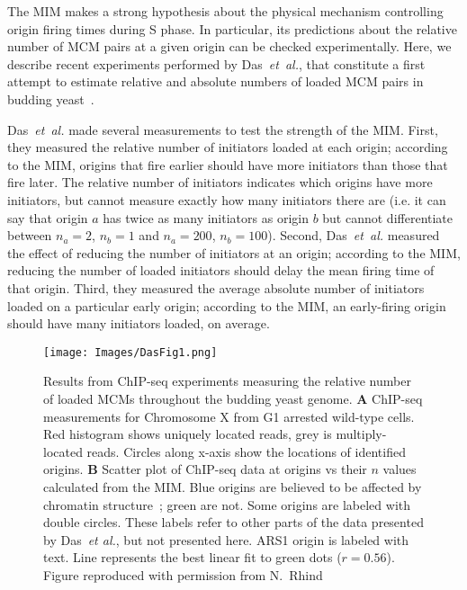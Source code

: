 {	The MIM makes a strong hypothesis about the physical mechanism controlling origin firing times during S phase.
	In particular, its predictions about the relative number of MCM pairs at a given origin can be checked experimentally.
	Here, we describe recent experiments performed by Das~\emph{et~al.}, that constitute a first attempt to estimate relative and absolute numbers of loaded MCM pairs in budding yeast~\cite{Rhind}.
	
	Das~\emph{et~al.} made several measurements to test the strength of the MIM.
	First, they measured the relative number of initiators loaded at each origin; according to the MIM, origins that fire earlier should have more initiators than those that fire later.
	The relative number of initiators indicates which origins have more initiators, but cannot measure exactly how many initiators there are (i.e. it can say that origin $a$ has twice as many initiators as origin $b$ but cannot differentiate between $n_a=2$, $n_b=1$ and $n_a=200$, $n_b=100$).
	Second, Das~\emph{et~al.} measured the effect of reducing the number of initiators at an origin; according to the MIM, reducing the number of loaded initiators should delay the mean firing time of that origin.
	Third, they measured the average absolute number of initiators loaded on a particular early origin; according to the MIM, an early-firing origin should have many initiators loaded, on average.
		
		\begin{figure}[tbh!]
			\begin{center}
				\texttt{[image: Images/DasFig1.png]}
			\end{center}
				\caption[Relative amounts of loaded MCM]{\label{fig:Das1} Results from ChIP-seq experiments measuring the relative number of loaded MCMs throughout the budding yeast genome.
					\textbf{A} ChIP-seq measurements for Chromosome X from G1 arrested wild-type cells.
					Red histogram shows uniquely located reads, grey is multiply-located reads.
					Circles along x-axis show the locations of identified origins.
					\textbf{B} Scatter plot of ChIP-seq data at origins vs their $n$ values calculated from the MIM.
					Blue origins are believed to be affected by chromatin structure~\cite{Chromatin}; green are not.
					Some origins are labeled with double circles.
					These labels refer to other parts of the data presented by Das~\emph{et al.}, but not presented here.
					ARS1 origin is labeled with text.
					Line represents the best linear fit to green dots ($r=0.56$).
					Figure reproduced with permission from N.~Rhind~\cite{Rhind}}
		\end{figure}
	
}
